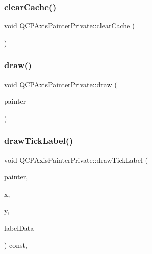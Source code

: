 \subsubsection{\texorpdfstring{clear\+Cache()}{clearCache()}}
{\footnotesize\ttfamily void Q\+C\+P\+Axis\+Painter\+Private\+::clear\+Cache (\begin{DoxyParamCaption}{ }\end{DoxyParamCaption})}

\mbox{\label{class_q_c_p_axis_painter_private_a0207a99bdf9c4f70af20928898ddc2fc}} 
\subsubsection{\texorpdfstring{draw()}{draw()}}
{\footnotesize\ttfamily void Q\+C\+P\+Axis\+Painter\+Private\+::draw (\begin{DoxyParamCaption}\item[{\hyperlink{class_q_c_p_painter}{Q\+C\+P\+Painter} $\ast$}]{painter }\end{DoxyParamCaption})\hspace{0.3cm}{\ttfamily [virtual]}}

\mbox{\label{class_q_c_p_axis_painter_private_aab666e1d85b234afbc88076c7ba9424a}} 
\subsubsection{\texorpdfstring{draw\+Tick\+Label()}{drawTickLabel()}}
{\footnotesize\ttfamily void Q\+C\+P\+Axis\+Painter\+Private\+::draw\+Tick\+Label (\begin{DoxyParamCaption}\item[{\hyperlink{class_q_c_p_painter}{Q\+C\+P\+Painter} $\ast$}]{painter,  }\item[{double}]{x,  }\item[{double}]{y,  }\item[{const \hyperlink{struct_q_c_p_axis_painter_private_1_1_tick_label_data}{Tick\+Label\+Data} \&}]{label\+Data }\end{DoxyParamCaption}) const\hspace{0.3cm}{\ttfamily [protected]}, {\ttfamily [virtual]}}

